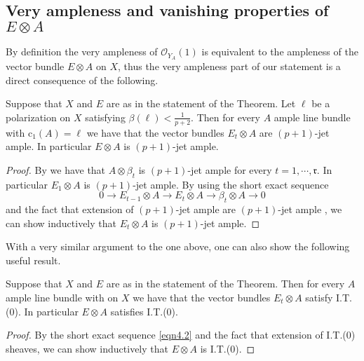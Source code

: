 \documentclass[11pt,letter]{amsart}
\numberwithin{equation}{section}
\begin{document}
\subsection{Very ampleness and vanishing properties of $E\otimes A$}
By definition the very ampleness of $\mathcal{O}_{Y_A}(1)$ is equivalent to the ampleness of the vector bundle $E\otimes A$ on $X$, thus the very ampleness part of our statement is a direct consequence of the following.
\begin{lemma}\label{lem:kample}
    Suppose that $X$ and $E$ are as in the statement of the Theorem. Let $\ell$ be a polarization on $X$ satisfying $\beta(\ell)<\frac{1}{p+2}$. Then for every $A$ ample line bundle with $\mathrm{c}_1(A)=\ell$ we have that the vector bundles $E_t\otimes A$ are $(p+1)$-jet ample. In particular $E\otimes A$ is $(p+1)$-jet ample.
\end{lemma}
\begin{proof}
    By \cite[Theorem D]{Caucci} we have that $A\otimes \beta_t$ is $(p+1)$-jet ample for every $t=1,\cdots, \mathfrak{r}$. In particular $E_1\otimes A$ is $(p+1)$-jet ample. By using the short exact sequence
    \begin{equation}\label{eqn4.2}
    0\rightarrow E_{t-1}\otimes A\longrightarrow E_t\otimes A\longrightarrow \beta_t\otimes A\rightarrow 0
    \end{equation}
    and the fact that extension of $(p+1)$-jet ample are $(p+1)$-jet ample \cite[Proposition 2.6]{BDS}, we can show inductively that $E_t\otimes A$ is $(p+1)$-jet ample.
\end{proof}
With a very similar argument to the one above, one can also show the following useful result.
\begin{lemma}\label{lem:EAIT0}
    Suppose that $X$ and $E$ are as in the statement of the Theorem. Then for every $A$ ample line bundle with on $X$ we have that the vector bundles $E_t\otimes A$ satisfy I.T.(0). In particular $E\otimes A$ satisfies I.T.(0).
\end{lemma}
\begin{proof}
By the short exact sequence \eqref{eqn4.2} and the fact that extension of I.T.(0) sheaves, we can show inductively that $E\otimes A$ is I.T.(0).
\end{proof}
\end{document}
